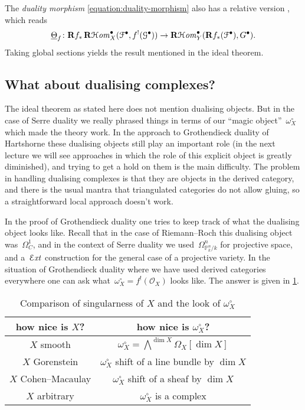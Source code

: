 \documentclass[10pt,a4paper]{article}
\begin{document}
\begin{remark}
  The \emph{duality morphism} \eqref{equation:duality-morphism} also has a relative version \cite[3.4.4]{conrad-grothendieck-duality-and-base-change}, which reads
  \begin{equation}
    \underline{\Theta}_f\colon\mathbf{R} f_*\operatorname{\mathbf{R}\mathcal{H}\mathit{om}}_X^\bullet(\mathcal{F}^\bullet,f^!(\mathcal{G}^\bullet))\to\operatorname{\mathbf{R}\mathcal{H}\mathit{om}}_Y^\bullet(\mathbf{R} f_*(\mathcal{F}^\bullet),G^\bullet).
  \end{equation}
  Taking global sections yields the result mentioned in the ideal theorem.
\end{remark}

\subsection{What about dualising complexes?}
The ideal theorem as stated here does not mention dualising objects. But in the case of Serre duality we really phrased things in terms of our ``magic object''~$\omega_X^\circ$ which made the theory work. In the approach to Grothendieck duality of Hartshorne these dualising objects still play an important role (in the next lecture we will see approaches in which the role of this explicit object is greatly diminished), and trying to get a hold on them is the main difficulty. The problem in handling dualising complexes is that they are objects in the derived category, and there is the usual mantra that triangulated categories do not allow gluing, so a straightforward local approach doesn't work.

In the proof of Grothendieck duality one tries to keep track of what the dualising object looks like. Recall that in the case of Riemann--Roch this dualising object was~$\Omega_C^1$, and in the context of Serre duality we used~$\Omega_{\mathbb{P}_k^n/k}^n$ for projective space, and a~$\operatorname{\mathcal{E}\mathit{xt}}$ construction for the general case of a projective variety. In the situation of Grothendieck duality where we have used derived categories everywhere one can ask what~$\omega_X^\circ=f^!(\mathcal{O}_X)$ looks like. The answer is given in \cref{table:comparison-X-dualising-sheaf}.

\begin{table}[p]
  \centering
  \begin{tabular}{cc}
    \toprule
    how nice is $X$? & how nice is $\omega_X^\circ$? \\\midrule
    $X$ smooth & $\omega_X^\circ=\bigwedge^{\dim X}\Omega_X[\dim X]$ \\
    $X$ Gorenstein & $\omega_X^\circ$ shift of a line bundle by $\dim X$ \\
    $X$ Cohen--Macaulay & $\omega_X^\circ$ shift of a sheaf by $\dim X$ \\
    $X$ arbitrary & $\omega_X^\circ$ is a complex \\
    \bottomrule
  \end{tabular}
  \caption{Comparison of singularness of $X$ and the look of $\omega_X^\circ$}
  \label{table:comparison-X-dualising-sheaf}
\end{table}
\end{document}
